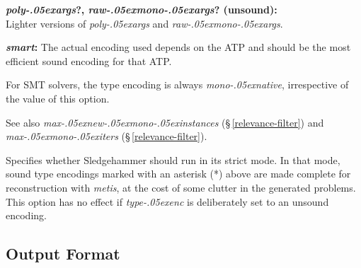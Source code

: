 \documentclass[a4paper,12pt]{article}
\let\oldS=\S
\def\S{\oldS\,}
\renewcommand\_{\hbox{\textunderscore\kern-.05ex}}
\begin{document}
\begin{enum}
\begin{enum}
\item[\labelitemi] \textbf{\textit{poly\_args}?, \textit{raw\_mono\_args}? (unsound):} \\
Lighter versions of \textit{poly\_args} and \textit{raw\_mono\_args}.

\item[\labelitemi] \textbf{\textit{smart}:} The actual encoding used depends on
the ATP and should be the most efficient sound encoding for that ATP.
\end{enum}

For SMT solvers, the type encoding is always \textit{mono\_native}, irrespective
of the value of this option.

\nopagebreak
{\small See also \textit{max\_new\_mono\_instances} (\S\ref{relevance-filter})
and \textit{max\_mono\_iters} (\S\ref{relevance-filter}).}

\opfalse{strict}{non\_strict}
Specifies whether Sledgehammer should run in its strict mode. In that mode,
sound type encodings marked with an asterisk (*) above are made complete
for reconstruction with \textit{metis}, at the cost of some clutter in the
generated problems. This option has no effect if \textit{type\_enc} is
deliberately set to an unsound encoding.
\end{enum}


\subsection{Output Format}
\label{output-format}
\end{document}
